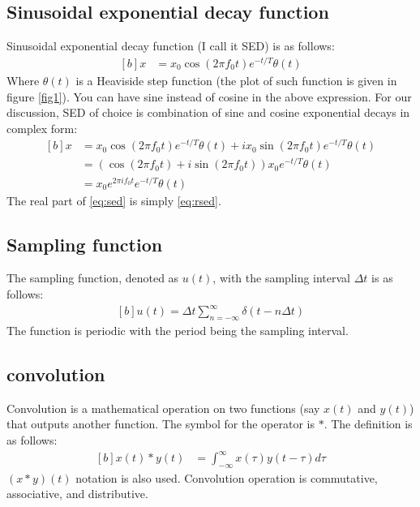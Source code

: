 \documentclass[letterpaper, 11pt]{article}
\newcommand{\fint}{\int_{-\infty}^{\infty}} %
\newcommand{\sed}[2]{#2_{0}e^{2\pi if_{0}#1}e^{-#1/T} \theta (#1)} %
\newcommand{\fsum}[1]{\sum_{#1 = -\infty}^{\infty}} %
\newcommand{\spf}[2]{\Delta #1 \fsum{#2} \delta (#1 - #2 \Delta #1)} %
\newcommand{\conv}[4]{\fint #3(#2)#4(#1 - #2) d#2} %
\numberwithin{equation}{section}
\numberwithin{figure}{section}
\begin{document}
\subsection{Sinusoidal exponential decay function}
Sinusoidal exponential decay function (I call it SED) is as follows:
\begin{equation}
	\begin{aligned}[b]
		x &= x_{0}\cos{(2\pi f_{0}t)}e^{-t/T} \theta(t)
		\label{eq:rsed}
	\end{aligned}
\end{equation}
Where \(\theta (t)\) is a Heaviside step function (the plot of such function is given in figure \ref{fig1}). You can have sine instead of cosine in the above expression. For our discussion, SED of choice is combination of sine and cosine exponential decays in complex form:
\begin{equation}
	\begin{aligned}[b]
		x	&= x_{0}\cos{(2\pi f_{0}t)}e^{-t/T} \theta(t)+ i x_{0}\sin{(2\pi f_{0}t)}e^{-t/T} \theta(t)\\
			&= (\cos{(2\pi f_{0}t)} +i \sin{(2\pi f_{0}t)})x_{0}e^{-t/T} \theta(t) \\
			&= \sed{t}{x}
			\label{eq:sed}
	\end{aligned}
\end{equation}
The real part of \eqref{eq:sed} is simply \eqref{eq:rsed}.

\subsection{Sampling function}
The sampling function, denoted as \(u(t)\), with the sampling interval \(\Delta t\) is as follows:
\begin{equation}
	\begin{aligned}[b]
		u(t) = \spf{t}{n}
	\end{aligned}
\end{equation}
The function is periodic with the period being the sampling interval. 

\subsection{convolution}
Convolution is a mathematical operation on two functions (say \(x(t)\) and \(y(t)\)) that outputs another function. The symbol for the operator is \(*\). The definition is as follows:
\begin{equation}
	\begin{aligned}[b]
		x(t)*y(t)
			&= \conv{t}{\tau}{x}{y}
			\label{eq:convolution}
	\end{aligned}
\end{equation}
\((x*y)(t)\) notation is also used. Convolution operation is commutative, associative, and distributive.
\end{document}
